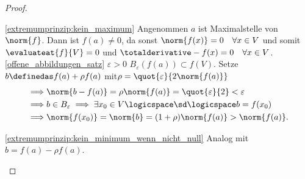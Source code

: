 \begin{proof}
  \begin{proofdescription}
    \item[\ref{extremumprinzip:kein_maximum}] Angenommen \( a \) ist Maximalstelle von \( \norm{f} \). Dann ist \( f(a)\neq 0 \), da sonst \( \norm{f(x)}=0\quad \forall x\in V \) und somit \( \evaluateat{f}{V}=0 \) und \( \totalderivative-{f}(x)=0\quad \forall x\in V \). \ref{offene_abbildungen_satz} \timplies \texists  \( \varepsilon>0 \) \sd \( B_{\varepsilon}(f(a))\subset f(V) \). Setze \( b\definedas f(a)+\rho f(a) \) mit\( \rho=\quot{\varepsilon}{2\norm{f(a)}} \) 
    \begin{align*}
      \implies &\norm{b-f(a)}=\rho\norm{f(a)}=\quot{\varepsilon}{2}<\varepsilon\\
      \implies &b\in B_{\varepsilon}\implies \exists x_0\in V  \logicspace \text{\sd}\logicspace b=f(x_0)\\
      \implies &\norm{f(x_0)}=\norm{b}=(1+\rho)\norm{f(a)}>\norm{f(a)}.
    \end{align*}
    \item[\ref{extremumprinzip:kein_minimum_wenn_nicht_null}] Analog mit \( b=f(a)-\rho f(a) \).
  \end{proofdescription}
  
\end{proof}
